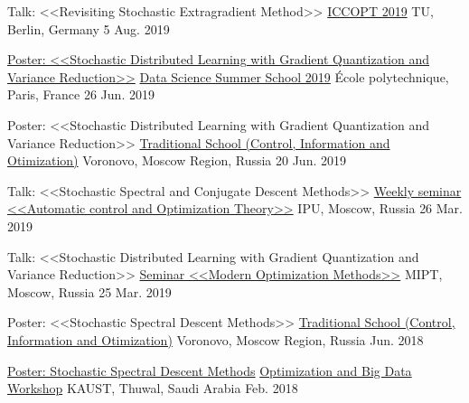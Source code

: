 


\begin{cventries}


\cventry
{Talk: <<Revisiting Stochastic Extragradient Method>>} %
{\href{https://iccopt2019.berlin/index.php}{ICCOPT 2019}} %
{TU, Berlin, Germany} %
{5 Aug. 2019} %
{
}

\cventry
{\href{https://2019.ds3-datascience-polytechnique.fr/wp-content/uploads/2019/06/DS3-608_2019.pdf}{Poster: <<Stochastic Distributed Learning with Gradient Quantization and Variance Reduction>>}} %
{\href{https://2019.ds3-datascience-polytechnique.fr}{Data Science Summer School 2019}} %
{École polytechnique, Paris, France} %
{26 Jun. 2019} %
{
}

\cventry
{Poster: <<Stochastic Distributed Learning with Gradient Quantization and Variance Reduction>>} %
{\href{http://ssopt.org}{Traditional School (Control, Information and Otimization)}} %
{Voronovo, Moscow Region, Russia} %
{20 Jun. 2019} %
{
}



\cventry
{Talk: <<Stochastic Spectral and Conjugate Descent Methods>>} %
{\href{https://www.ipu.ru/node/50794}{Weekly seminar <<Automatic control and Optimization Theory>>}} %
{IPU, Moscow, Russia} %
{26 Mar. 2019} %
{
}

\cventry
{Talk: <<Stochastic Distributed Learning with Gradient Quantization and Variance Reduction>>}
{\href{https://vk.com/miptopt?w=wall-132864820_40\%2Fall}{Seminar <<Modern Optimization Methods>>}}
{MIPT, Moscow, Russia}
{25 Mar. 2019}
{
}

\cventry
{Poster: <<Stochastic Spectral Descent Methods>>} %
{\href{https://sites.google.com/site/traditionalschool/}{Traditional School (Control, Information and Otimization)}} %
{Voronovo, Moscow Region, Russia} %
{Jun. 2018} %
{
}

\cventry
{\href{https://epostersonline.com/obd2018/node/51}{Poster: Stochastic Spectral Descent Methods}} %
{\href{https://obd.kaust.edu.sa/}{Optimization and Big Data Workshop}} %
{KAUST, Thuwal, Saudi Arabia} %
{Feb. 2018} %
{
}







\end{cventries}